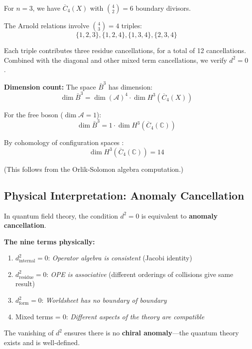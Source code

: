\begin{computation}\label{comp:d-squared-deg3}
For $n=3$, we have $\overline{C}_4(X)$ with $\binom{4}{2} = 6$ boundary divisors.

The Arnold relations involve $\binom{4}{3} = 4$ triples:
$$\{1,2,3\}, \{1,2,4\}, \{1,3,4\}, \{2,3,4\}$$

Each triple contributes three residue cancellations, for a total of 12 cancellations.
Combined with the diagonal and other mixed term cancellations, we verify $d^2 = 0$.

\textbf{Dimension count:} The space $\bar{B}^3$ has dimension:
$$\dim \bar{B}^3 = \dim(\mathcal{A})^4 \cdot \dim H^3(\overline{C}_4(X))$$

For the free boson ($\dim \mathcal{A} = 1$):
$$\dim \bar{B}^3 = 1 \cdot \dim H^3(\overline{C}_4(\mathbb{C}))$$

By cohomology of configuration spaces \cite{ArnoldCohomology}:
$$\dim H^3(\overline{C}_4(\mathbb{C})) = 14$$

(This follows from the Orlik-Solomon algebra computation.)
\end{computation}

\subsection{Physical Interpretation: Anomaly Cancellation}

\begin{perspective}\label{persp:witten-anomaly}
In quantum field theory, the condition $d^2 = 0$ is equivalent to \textbf{anomaly cancellation}.

\textbf{The nine terms physically:}
\begin{enumerate}
\item $d_{\text{internal}}^2 = 0$: \emph{Operator algebra is consistent} (Jacobi identity)
\item $d_{\text{residue}}^2 = 0$: \emph{OPE is associative} (different orderings of collisions
give same result)
\item $d_{\text{form}}^2 = 0$: \emph{Worldsheet has no boundary of boundary}
\item Mixed terms = 0: \emph{Different aspects of the theory are compatible}
\end{enumerate}

The vanishing of $d^2$ ensures there is no \textbf{chiral anomaly}---the quantum theory
exists and is well-defined.
\end{perspective}

